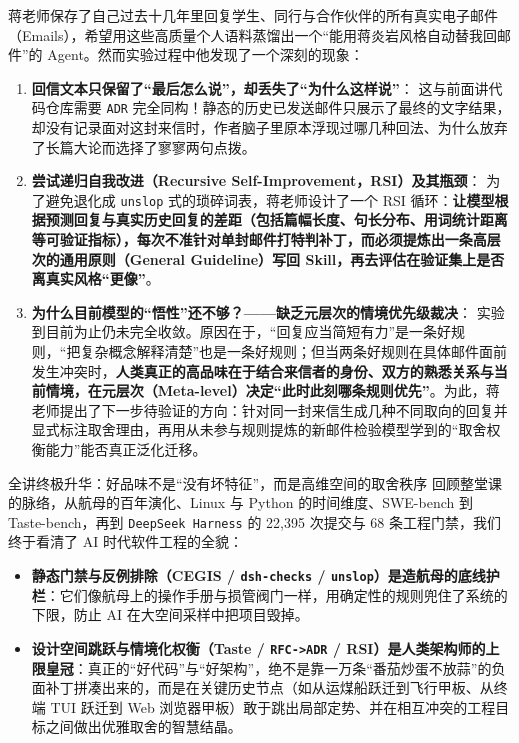 \documentclass[a4paper]{article}
\begin{document}
蒋老师保存了自己过去十几年里回复学生、同行与合作伙伴的所有真实电子邮件（Emails），希望用这些高质量个人语料蒸馏出一个“能用蒋炎岩风格自动替我回邮件”的 Agent。然而实验过程中他发现了一个深刻的现象：
\begin{enumerate}
    \item \textbf{回信文本只保留了“最后怎么说”，却丢失了“为什么这样说”}：
    这与前面讲代码仓库需要 \texttt{ADR} 完全同构！静态的历史已发送邮件只展示了最终的文字结果，却没有记录面对这封来信时，作者脑子里原本浮现过哪几种回法、为什么放弃了长篇大论而选择了寥寥两句点拨。
    \item \textbf{尝试递归自我改进（Recursive Self-Improvement，RSI）及其瓶颈}：
    为了避免退化成 \texttt{unslop} 式的琐碎词表，蒋老师设计了一个 RSI 循环：\textbf{让模型根据预测回复与真实历史回复的差距（包括篇幅长度、句长分布、用词统计距离等可验证指标），每次不准针对单封邮件打特判补丁，而必须提炼出一条高层次的通用原则（General Guideline）写回 Skill，再去评估在验证集上是否离真实风格“更像”}。
    \item \textbf{为什么目前模型的“悟性”还不够？——缺乏元层次的情境优先级裁决}：
    实验到目前为止仍未完全收敛。原因在于，“回复应当简短有力”是一条好规则，“把复杂概念解释清楚”也是一条好规则；但当两条好规则在具体邮件面前发生冲突时，\textbf{人类真正的高品味在于结合来信者的身份、双方的熟悉关系与当前情境，在元层次（Meta-level）决定“此时此刻哪条规则优先”}。为此，蒋老师提出了下一步待验证的方向：针对同一封来信生成几种不同取向的回复并显式标注取舍理由，再用从未参与规则提炼的新邮件检验模型学到的“取舍权衡能力”能否真正泛化迁移。
\end{enumerate}

\begin{importantbox}{全讲终极升华：好品味不是“没有坏特征”，而是高维空间的取舍秩序}
回顾整堂课的脉络，从航母的百年演化、Linux 与 Python 的时间维度、SWE-bench 到 Taste-bench，再到 \texttt{DeepSeek Harness} 的 22,395 次提交与 68 条工程门禁，我们终于看清了 AI 时代软件工程的全貌：
\begin{itemize}
    \item \textbf{静态门禁与反例排除（CEGIS / \texttt{dsh-checks} / \texttt{unslop}）是造航母的底线护栏}：它们像航母上的操作手册与损管阀门一样，用确定性的规则兜住了系统的下限，防止 AI 在大空间采样中把项目毁掉。
    \item \textbf{设计空间跳跃与情境化权衡（Taste / \texttt{RFC->ADR} / RSI）是人类架构师的上限皇冠}：真正的“好代码”与“好架构”，绝不是靠一万条“番茄炒蛋不放蒜”的负面补丁拼凑出来的，而是在关键历史节点（如从运煤船跃迁到飞行甲板、从终端 TUI 跃迁到 Web 浏览器甲板）敢于跳出局部定势、并在相互冲突的工程目标之间做出优雅取舍的智慧结晶。
\end{itemize}
\end{importantbox}
\end{document}
